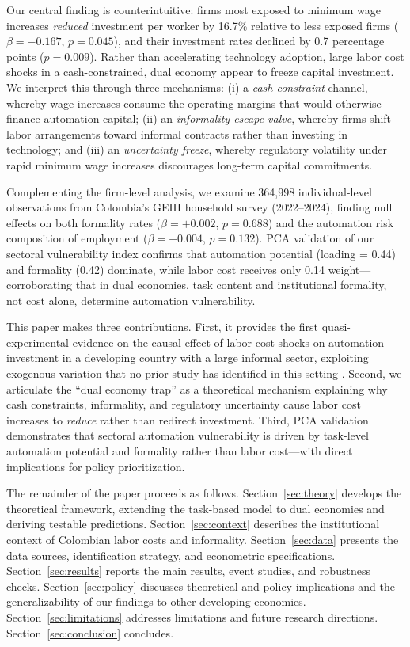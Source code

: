 \documentclass[5p,times,authoryear]{elsarticle}
\begin{document}
Our central finding is counterintuitive: firms most exposed to minimum wage increases \emph{reduced} investment per worker by 16.7\% relative to less exposed firms ($\beta = -0.167$, $p = 0.045$), and their investment rates declined by 0.7 percentage points ($p = 0.009$). Rather than accelerating technology adoption, large labor cost shocks in a cash-constrained, dual economy appear to freeze capital investment. We interpret this through three mechanisms: (i) a \emph{cash constraint} channel, whereby wage increases consume the operating margins that would otherwise finance automation capital; (ii) an \emph{informality escape valve}, whereby firms shift labor arrangements toward informal contracts rather than investing in technology; and (iii) an \emph{uncertainty freeze}, whereby regulatory volatility under rapid minimum wage increases discourages long-term capital commitments.

Complementing the firm-level analysis, we examine 364,998 individual-level observations from Colombia's GEIH household survey (2022--2024), finding null effects on both formality rates ($\beta = +0.002$, $p = 0.688$) and the automation risk composition of employment ($\beta = -0.004$, $p = 0.132$). PCA validation of our sectoral vulnerability index confirms that automation potential (loading = 0.44) and formality (0.42) dominate, while labor cost receives only 0.14 weight---corroborating that in dual economies, task content and institutional formality, not cost alone, determine automation vulnerability.

This paper makes three contributions. First, it provides the first quasi-experimental evidence on the causal effect of labor cost shocks on automation investment in a developing country with a large informal sector, exploiting exogenous variation that no prior study has identified in this setting \citep{graetz2018, koch2021, bid2023, morales2023risk}. Second, we articulate the ``dual economy trap'' as a theoretical mechanism explaining why cash constraints, informality, and regulatory uncertainty cause labor cost increases to \emph{reduce} rather than redirect investment. Third, PCA validation demonstrates that sectoral automation vulnerability is driven by task-level automation potential and formality rather than labor cost---with direct implications for policy prioritization.

The remainder of the paper proceeds as follows. Section~\ref{sec:theory} develops the theoretical framework, extending the task-based model to dual economies and deriving testable predictions. Section~\ref{sec:context} describes the institutional context of Colombian labor costs and informality. Section~\ref{sec:data} presents the data sources, identification strategy, and econometric specifications. Section~\ref{sec:results} reports the main results, event studies, and robustness checks. Section~\ref{sec:policy} discusses theoretical and policy implications and the generalizability of our findings to other developing economies. Section~\ref{sec:limitations} addresses limitations and future research directions. Section~\ref{sec:conclusion} concludes.
\end{document}

